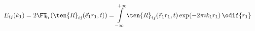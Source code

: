 \begin{equation}\label{eq:hit_1d_energy_spectra}
  E_{ij}(k_1) = 2 \FT_{\kern-0.3em k_1} (\ten{R}_{ij}(\vec{e}_1r_1, t)) =
    \int\limits_{-\infty}^{+\infty}
      \ten{R}_{ij}(\vec{e}_1r_1, t) \exp(-2\pi\imath k_1r_1)
      \,\odif{r_1}
\end{equation}
